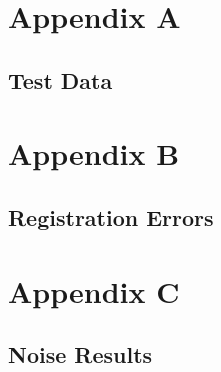 \makeatletter
\chapter{Appendix A}
\label{AppendixA}

\section{Test Data}



\chapter{Appendix B}
\label{RawQuantitative1}

\section{Registration Errors}

\chapter{Appendix C}
\label{RawQuantitative2}

\section{Noise Results}